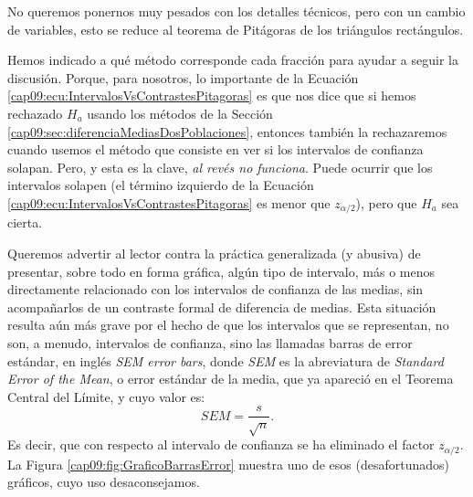 \noindent No queremos ponernos muy pesados con los detalles técnicos, pero con un cambio de variables, esto se reduce al teorema de Pitágoras de los triángulos rectángulos.

Hemos indicado a qué método corresponde cada fracción para ayudar a seguir la discusión. Porque, para nosotros, lo importante de la Ecuación \ref{cap09:ecu:IntervalosVsContrastesPitagoras} es que nos dice que si hemos rechazado $H_a$ usando los métodos de la Sección \ref{cap09:sec:diferenciaMediasDosPoblaciones}, entonces también la rechazaremos cuando usemos el método que consiste en ver si los intervalos de confianza solapan. Pero, y esta es la clave, {\em al revés no funciona}. Puede ocurrir que los intervalos solapen (el término izquierdo de la Ecuación \ref{cap09:ecu:IntervalosVsContrastesPitagoras} es menor que $z_{\alpha/2}$), pero que $H_a$ sea cierta.

    \begin{center}
    \end{center}
Queremos advertir al lector contra la práctica generalizada (y abusiva) de presentar, sobre todo en
forma gráfica, algún tipo de intervalo, más o menos directamente relacionado con los intervalos
de confianza de las medias,  sin acompañarlos de un contraste formal de diferencia de medias. Esta
situación resulta aún más grave por el hecho de que los intervalos que se representan, no son, a
menudo, intervalos de confianza, sino las llamadas {\sf barras de error estándar},  en inglés {\em SEM error bars}, donde {\em SEM} es la
abreviatura de {\em Standard Error of the Mean}, o error estándar de la media, que ya apareció en el Teorema Central del Límite, y cuyo valor es:
\[SEM=\dfrac{s}{\sqrt{n}}.\]
Es decir, que con respecto al intervalo de confianza se ha eliminado el factor $z_{\alpha/2}$. La
Figura \ref{cap09:fig:GraficoBarrasError} muestra uno de esos (desafortunados) gráficos, cuyo uso
desaconsejamos.

